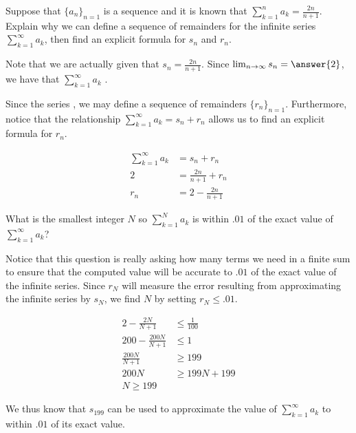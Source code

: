 \documentclass{ximera}
\begin{document}
\begin{example}
Suppose that $\{a_n\}_{n=1}$ is a sequence and it is known that $\sum_{k=1}^{n} a_k = \frac{2n}{n+1}$.  Explain why we can define a sequence of remainders for the infinite series $\sum_{k=1}^{\infty} a_k$, then find an explicit formula for $s_n$ and $r_n$.

\begin{explanation}
Note that we are actually given that $s_n = \frac{2n}{n+1}$.  Since $\lim_{n \to \infty} s_n = \answer{2}$, we have that $\sum_{k=1}^{\infty} a_k$  .

Since the series , we may define a sequence of remainders $\{r_n\}_{n=1}$.  Furthermore, notice that the relationship $\sum_{k=1}^{\infty} a_k = s_n+r_n$ allows us to find an explicit formula for $r_n$.

\begin{align*}
\sum_{k=1}^{\infty} a_k &= s_n+r_n \\
2 &= \frac{2n}{n+1}+r_n \\
r_n &= 2-\frac{2n}{n+1}
\end{align*}

\end{explanation}

What is the smallest integer $N$ so $\sum_{k=1}^{N} a_k$ is within $.01$ of the exact value of $\sum_{k=1}^{\infty} a_k$?

\begin{explanation}
Notice that this question is really asking how many terms we need in a finite sum to ensure that the computed value will be accurate to $.01$ of the exact value of the infinite series.  Since $r_N$ will measure the error resulting from approximating the infinite series by $s_N$, we find $N$ by setting $r_N \leq .01$.

\begin{align*}
2-\frac{2N}{N+1} &\leq \frac{1}{100} \\
200-\frac{200N}{N+1} & \leq 1 \\
\frac{200N}{N+1} & \geq 199 \\
200N & \geq 199N+199 \\
N \geq 199
\end{align*}

We thus know that $s_{199}$ can be used to approximate the value of $\sum_{k=1}^{\infty} a_k$ to within $.01$ of its exact value.
\end{explanation}

\end{example}
\end{document}
